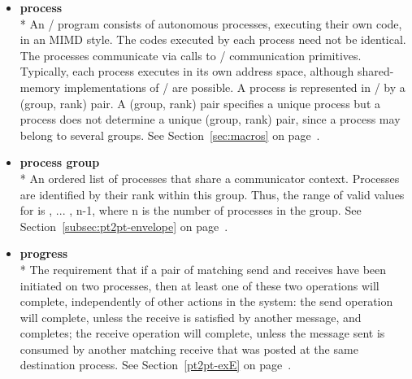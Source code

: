 \begin{itemize}
\label{glossary:process}
\item \textbf{ process} \\*
An \MPI/ program consists of autonomous processes, executing their own
code, in an 
MIMD style. The codes executed by each process need not be
identical.  The processes communicate via calls to \MPI/ communication
primitives.  Typically, each process executes in its own address
space, although shared-memory implementations of \MPI/ are possible.
A process is represented in \MPI/ by a (group, rank) pair. 
A (group, rank) pair specifies a unique process but 
a process does not determine a unique (group, rank) pair, since
a process may belong to several groups.
See Section~\ref{sec:macros} on page~\pageref{sec:macros}.

\label{glossary:process_group}
\item \textbf{ process group} \\*
An ordered list of processes that share a communicator context. Processes are identified by their
rank within this group.  Thus, the range of valid values for  is
{, ... , n-1}, where {\sf n} is the number of
processes in the group.  
See Section~\ref{subsec:pt2pt-envelope} on page~\pageref{subsec:pt2pt-envelope}.

\label{glossary:progress}
\item \textbf{ progress} \\*
The requirement that
if a pair of
matching send and receives have been initiated on two processes, then at
least one of these two operations will complete, independently of
other actions in the system:  the send operation will
complete, unless the receive is satisfied by another message, and
completes; the
receive operation will complete, unless the message sent is consumed by another
matching receive that was posted at the same destination process.
See Section~\ref{pt2pt-exE} on page~\pageref{pt2pt-exE}.


\end{itemize}

